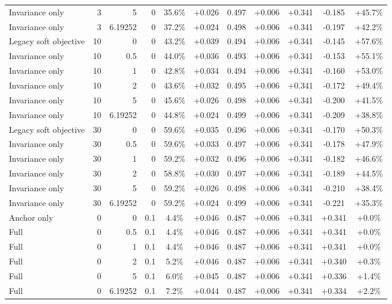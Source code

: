 \begin{table}[htbp]
\begin{tabular}{lrrrccccccc}
Invariance only & 3 & 5 & 0 & 35.6\% & +0.026 & 0.497 & +0.006 & +0.341 & -0.185 & +45.7\% \\
Invariance only & 3 & 6.19252 & 0 & 37.2\% & +0.024 & 0.498 & +0.006 & +0.341 & -0.197 & +42.2\% \\
Legacy soft objective & 10 & 0 & 0 & 43.2\% & +0.039 & 0.494 & +0.006 & +0.341 & -0.145 & +57.6\% \\
Invariance only & 10 & 0.5 & 0 & 44.0\% & +0.036 & 0.493 & +0.006 & +0.341 & -0.153 & +55.1\% \\
Invariance only & 10 & 1 & 0 & 42.8\% & +0.034 & 0.494 & +0.006 & +0.341 & -0.160 & +53.0\% \\
Invariance only & 10 & 2 & 0 & 43.6\% & +0.032 & 0.495 & +0.006 & +0.341 & -0.172 & +49.4\% \\
Invariance only & 10 & 5 & 0 & 45.6\% & +0.026 & 0.498 & +0.006 & +0.341 & -0.200 & +41.5\% \\
Invariance only & 10 & 6.19252 & 0 & 44.8\% & +0.024 & 0.499 & +0.006 & +0.341 & -0.209 & +38.8\% \\
Legacy soft objective & 30 & 0 & 0 & 59.6\% & +0.035 & 0.496 & +0.006 & +0.341 & -0.170 & +50.3\% \\
Invariance only & 30 & 0.5 & 0 & 59.6\% & +0.033 & 0.497 & +0.006 & +0.341 & -0.178 & +47.9\% \\
Invariance only & 30 & 1 & 0 & 59.2\% & +0.032 & 0.496 & +0.006 & +0.341 & -0.182 & +46.6\% \\
Invariance only & 30 & 2 & 0 & 58.8\% & +0.030 & 0.497 & +0.006 & +0.341 & -0.189 & +44.5\% \\
Invariance only & 30 & 5 & 0 & 59.2\% & +0.026 & 0.498 & +0.006 & +0.341 & -0.210 & +38.4\% \\
Invariance only & 30 & 6.19252 & 0 & 59.2\% & +0.024 & 0.499 & +0.006 & +0.341 & -0.221 & +35.3\% \\
Anchor only & 0 & 0 & 0.1 & 4.4\% & +0.046 & 0.487 & +0.006 & +0.341 & +0.341 & +0.0\% \\
Full & 0 & 0.5 & 0.1 & 4.4\% & +0.046 & 0.487 & +0.006 & +0.341 & +0.341 & +0.0\% \\
Full & 0 & 1 & 0.1 & 4.4\% & +0.046 & 0.487 & +0.006 & +0.341 & +0.341 & +0.0\% \\
Full & 0 & 2 & 0.1 & 5.2\% & +0.046 & 0.487 & +0.006 & +0.341 & +0.340 & +0.3\% \\
Full & 0 & 5 & 0.1 & 6.0\% & +0.045 & 0.487 & +0.006 & +0.341 & +0.336 & +1.4\% \\
Full & 0 & 6.19252 & 0.1 & 7.2\% & +0.044 & 0.487 & +0.006 & +0.341 & +0.334 & +2.2\% \\

\end{tabular}
\end{table}
